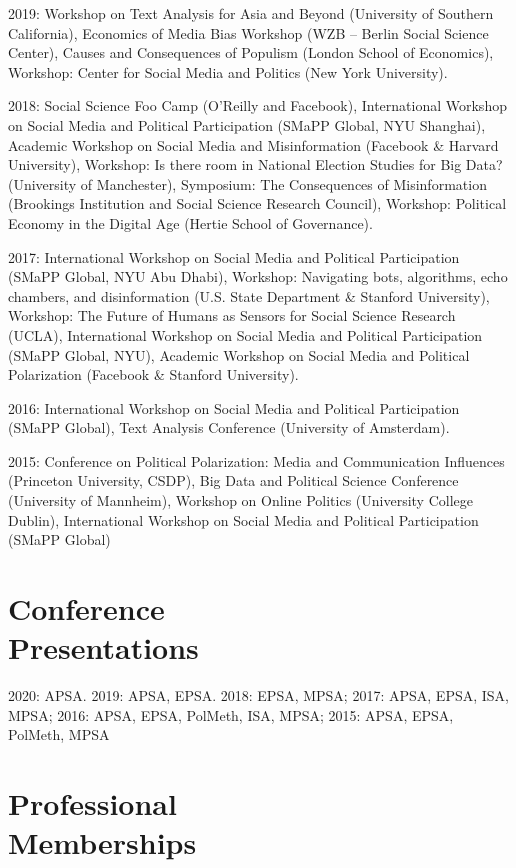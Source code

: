 \documentclass[margin,line,11pt]{resume}
\begin{document}
\begin{resume}
2019: Workshop on Text Analysis for Asia and Beyond (University of Southern California), Economics of Media Bias Workshop (WZB -- Berlin Social Science Center), Causes and Consequences of Populism (London School of Economics), Workshop: Center for Social Media and Politics (New York University).
    
      
2018: Social Science Foo Camp (O'Reilly and Facebook), International Workshop on Social Media and Political Participation (SMaPP Global, NYU Shanghai), Academic Workshop on Social Media and Misinformation (Facebook \& Harvard University), Workshop: Is there room in National Election Studies for Big Data? (University of Manchester), Symposium: The Consequences of Misinformation (Brookings Institution and Social Science Research Council), Workshop: Political Economy in the Digital Age (Hertie School of Governance).



2017: International Workshop on Social Media and Political Participation (SMaPP Global, NYU Abu Dhabi), Workshop: Navigating bots, algorithms, echo chambers, and disinformation (U.S. State Department \& Stanford University), Workshop: The Future of Humans as Sensors for Social Science Research (UCLA),  International Workshop on Social Media and Political Participation (SMaPP Global, NYU), Academic Workshop on Social Media and Political Polarization (Facebook \& Stanford University).

2016: International Workshop on Social Media and Political Participation (SMaPP Global), Text Analysis Conference (University of Amsterdam).

2015: Conference on Political Polarization: Media and Communication Influences (Princeton University, CSDP), Big Data and Political Science Conference (University of Mannheim), Workshop on Online Politics (University College Dublin), International Workshop on Social Media and Political Participation (SMaPP Global)

        \section{\mysidestyle Conference\\Presentations}
        
2020: APSA. 2019: APSA, EPSA. 2018: EPSA, MPSA; 2017: APSA, EPSA, ISA, MPSA; 2016: APSA, EPSA, PolMeth, ISA, MPSA; 2015: APSA, EPSA, PolMeth, MPSA


\section{\mysidestyle Professional\\Memberships}


\end{resume}
\end{document}
